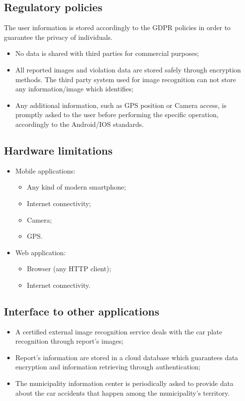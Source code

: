 \subsection{Regulatory policies}
The user information is stored accordingly to the GDPR policies in order to guarantee the privacy of individuals.
\begin{itemize}
    \item No data is shared with third parties for commercial purposes;
    \item All reported images and violation data are stored safely through encryption methods. The third party system used for image recognition can not store any information/image which identifies;
    \item Any additional information, such as GPS position or Camera access, is promptly asked to the user before performing the specific operation, accordingly to the Android/IOS standards.
\end{itemize}


\subsection{Hardware limitations}
\begin{itemize}
    \item Mobile applications:
    \begin{itemize}
        \item Any kind of modern smartphone;
        \item Internet connectivity;
        \item Camera;
        \item GPS.
    \end{itemize}
    \item Web application:
    \begin{itemize}
        \item Browser (any HTTP client);
        \item Internet connectivity.
    \end{itemize}
\end{itemize}

\subsection{Interface to other applications}
\begin{itemize}
    \item A certified external image recognition service deals with the car plate recognition through report's images;
    \item Report's information are stored in a cloud database which guarantees data encryption and information retrieving through authentication;
    \item The municipality information center is periodically asked to provide data about the car accidents that happen among the municipality's territory.
\end{itemize}
